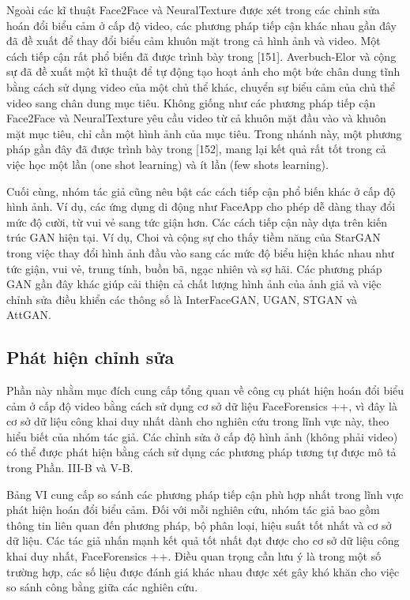 \documentclass{article}
\begin{document}
Ngoài các kĩ thuật Face2Face và NeuralTexture được xét trong các chỉnh sửa hoán đổi biểu cảm ở cấp độ video, các phương pháp tiếp cận khác nhau gần đây đã đề xuất để thay đổi biểu cảm khuôn mặt trong cả hình ảnh và video. Một cách tiếp cận rất phổ biến đã được trình bày trong [151]. Averbuch-Elor và cộng sự đã đề xuất một kĩ thuật để tự động tạo hoạt ảnh cho một bức chân dung tĩnh bằng cách sử dụng video của một chủ thể khác, chuyển sự biểu cảm của chủ thể video sang chân dung mục tiêu. Không giống như các phương pháp tiếp cận Face2Face và NeuralTexture yêu cầu video từ cả khuôn mặt đầu vào và khuôn mặt mục tiêu, chỉ cần một hình ảnh của mục tiêu. Trong nhánh này, một phương pháp gần đây đã được trình bày trong [152], mang lại kết quả rất tốt trong cả việc học một lần (one shot learning) và ít lần (few shots learning).

Cuối cùng, nhóm tác giả cũng nêu bật các cách tiếp cận phổ biến khác ở cấp độ hình ảnh. Ví dụ, các ứng dụng di động như FaceApp cho phép dễ dàng thay đổi mức độ cười, từ vui vẻ sang tức giận hơn. Các cách tiếp cận này dựa trên kiến trúc GAN hiện tại. Ví dụ, Choi và cộng sự  cho thấy tiềm năng của StarGAN trong việc thay đổi hình ảnh đầu vào sang các mức độ biểu hiện khác nhau như tức giận, vui vẻ, trung tính, buồn bã, ngạc nhiên và sợ hãi. Các phương pháp GAN gần đây khác giúp cải thiện cả chất lượng hình ảnh của ảnh giả và việc chỉnh sửa điều khiển các thông số là InterFaceGAN, UGAN, STGAN và AttGAN.

\subsection{Phát hiện chỉnh sửa}


Phần này nhằm mục đích cung cấp tổng quan về công cụ phát hiện hoán đổi biểu cảm ở cấp độ video bằng cách sử dụng cơ sở dữ liệu FaceForensics ++, vì đây là cơ sở dữ liệu công khai duy nhất dành cho nghiên cứu trong lĩnh vực này, theo hiểu biết của nhóm tác giả. Các chỉnh sửa ở cấp độ hình ảnh (không phải video) có thể được phát hiện bằng cách sử dụng các phương pháp tương tự được mô tả trong Phần. III-B và V-B.

Bảng VI cung cấp so sánh các phương pháp tiếp cận phù hợp nhất trong lĩnh vực phát hiện hoán đổi biểu cảm. Đối với mỗi nghiên cứu, nhóm tác giả bao gồm thông tin liên quan đến phương pháp, bộ phân loại, hiệu suất tốt nhất và cơ sở dữ liệu. Các tác giả nhấn mạnh kết quả tốt nhất đạt được cho cơ sở dữ liệu công khai duy nhất, FaceForensics ++. Điều quan trọng cần lưu ý là trong một số trường hợp, các số liệu được đánh giá khác nhau được xét gây khó khăn cho việc so sánh công bằng giữa các nghiên cứu.
\end{document}
